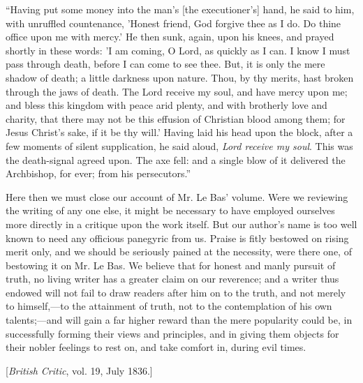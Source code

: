 ``Having put some money into the man's
[the executioner's] hand, he said to him, with unruffled countenance, 'Honest
friend, God forgive thee as I do. Do thine office upon me with mercy.'
He then sunk, again, upon his knees, and prayed shortly in these words: 'I
am coming, O Lord, as quickly as I can. I know I must pass through
death, before I can come to see thee. But, it is only the mere shadow of
death; a little darkness upon nature. Thou, by thy merits, hast broken
through the jaws of death. The Lord receive my soul, and have mercy upon
me; and bless this kingdom with peace arid plenty, and with brotherly
love and charity, that there may not be this effusion of Christian blood
among them; for Jesus Christ's sake, if it be thy will.' Having laid his
head upon the block, after a few moments of silent supplication, he said
aloud, \emph{Lord receive my soul}. This was the death-signal agreed
upon. The axe fell: and a single blow of it delivered the Archbishop,
for ever; from his persecutors.''

Here then we must close our account of Mr. Le Bas'
volume. Were we reviewing the writing of any one else, it might be
necessary to have employed ourselves more directly in a critique upon
the work itself. But our author's name is too well known to need any
officious panegyric from us. Praise is fitly bestowed on rising merit
only, and we should be seriously pained at the necessity, were there
one, of bestowing it on Mr. Le Bas. We believe that for honest and manly
pursuit of truth, no living writer has a greater claim on our
reverence; and a writer thus endowed will not fail to draw readers after
him on to the truth, and not merely to himself,—to the attainment of
truth, not to the contemplation of his own talents;—and will gain a
far higher reward than the mere popularity could be, in successfully
forming their views and principles, and in giving them objects for their
nobler feelings to rest on, and take comfort in, during evil times.


[\emph{British
Critic}, vol. 19, July 1836.]

